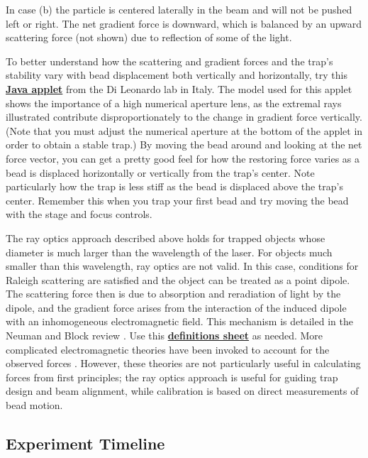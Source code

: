 \documentclass{../lab}
\begin{document}
In case (b) the particle is centered laterally in the beam and will not be pushed left or right. The net gradient force is downward, which is balanced by an upward scattering force (not shown) due to reflection of some of the light.

To better understand how the scattering and gradient forces and the trap's stability vary with bead displacement both vertically and horizontally, try this \href{http://glass.phys.uniroma1.it/dileonardo/content/apps/trapforces.php}{\textbf{Java applet}} from the Di Leonardo lab \cite{Leonardo} in Italy. The model used for this applet shows the importance of a high numerical aperture lens, as the extremal rays illustrated contribute disproportionately to the change in gradient force vertically. (Note that you must adjust the numerical aperture at the bottom of the applet in order to obtain a stable trap.) By moving the bead around and looking at the net force vector, you can get a pretty good feel for how the restoring force varies as a bead is displaced horizontally or vertically from the trap's center. Note particularly how the trap is less stiff as the bead is displaced above the trap's center. Remember this when you trap your first bead and try moving the bead with the stage and focus controls.

The ray optics approach described above holds for trapped objects whose diameter is much larger than the wavelength of the laser. For objects much smaller than this wavelength, ray optics are not valid. In this case, conditions for Raleigh scattering are satisfied and the object can be treated as a point dipole. The scattering force then is due to absorption and reradiation of light by the dipole, and the gradient force arises from the interaction of the induced dipole with an inhomogeneous electromagnetic field. This mechanism is detailed in the Neuman and Block review \cite{Neuman}. Use this \href{http://physics111.lib.berkeley.edu/Physics111/Reprints/OTZ/biowikipedia.pdf}{\textbf{definitions sheet}} as needed. More complicated electromagnetic theories have been invoked to account for the observed forces \cite{Neuman,Bechhoefer,Shaevitz}. However, these theories are not particularly useful in calculating forces from first principles; the ray optics approach is useful for guiding trap design and beam alignment, while calibration is based on direct measurements of bead motion.

\subsection{Experiment Timeline}
\end{document}
